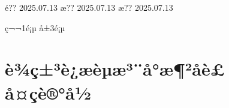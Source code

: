 \documentclass[UTF8,10pt,a4paper,fontset=fandol]{ctexart}
\newcommand{\handwritten}[1]{#1}
\begin{document}
\noindent
\handwritten{é??}\quad
\handwritten{2025.07.13}
\hfill
\handwritten{æ??}\quad
\handwritten{2025.07.13}
\hfill
\handwritten{æ??}\quad
\handwritten{2025.07.13}

\vfill
\begin{center}
ç¬¬1é¡µ å±3é¡µ
\end{center}

\newpage

\section*{è¾ç±³è¿æèµæ³¨å°æ¶²åè£å¤çè®°å½}
\end{document}
